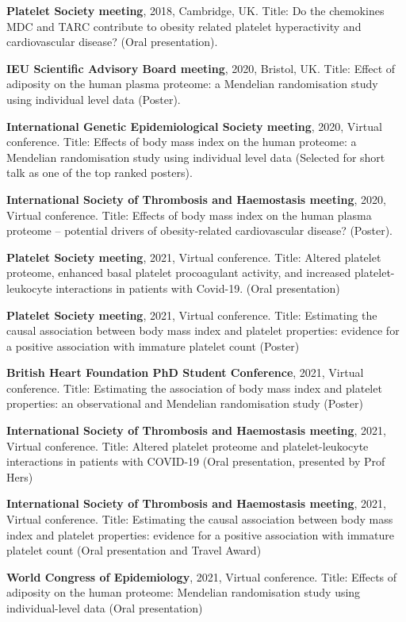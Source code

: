\documentclass[11pt,twoside]{bristolthesis}
\begin{document}
\textbf{Platelet Society meeting}, 2018, Cambridge, UK. Title: Do the chemokines MDC and TARC contribute to obesity related platelet hyperactivity and cardiovascular disease? (Oral presentation).

\textbf{IEU Scientific Advisory Board meeting}, 2020, Bristol, UK. Title: Effect of adiposity on the human plasma proteome: a Mendelian randomisation study using individual level data (Poster).

\textbf{International Genetic Epidemiological Society meeting}, 2020, Virtual conference. Title: Effects of body mass index on the human proteome: a Mendelian randomisation study using individual level data (Selected for short talk as one of the top ranked posters).

\textbf{International Society of Thrombosis and Haemostasis meeting}, 2020, Virtual conference. Title: Effects of body mass index on the human plasma proteome -- potential drivers of obesity-related cardiovascular disease? (Poster).

\textbf{Platelet Society meeting}, 2021, Virtual conference. Title: Altered platelet proteome, enhanced basal platelet procoagulant activity, and increased platelet-leukocyte interactions in patients with Covid-19. (Oral presentation)

\textbf{Platelet Society meeting}, 2021, Virtual conference. Title: Estimating the causal association between body mass index and platelet properties: evidence for a positive association with immature platelet count (Poster)

\textbf{British Heart Foundation PhD Student Conference}, 2021, Virtual conference. Title: Estimating the association of body mass index and platelet properties: an observational and Mendelian randomisation study (Poster)

\textbf{International Society of Thrombosis and Haemostasis meeting}, 2021, Virtual conference. Title: Altered platelet proteome and platelet-leukocyte interactions in patients with COVID-19 (Oral presentation, presented by Prof Hers)

\textbf{International Society of Thrombosis and Haemostasis meeting}, 2021, Virtual conference. Title: Estimating the causal association between body mass index and platelet properties: evidence for a positive association with immature platelet count (Oral presentation and Travel Award)

\textbf{World Congress of Epidemiology}, 2021, Virtual conference. Title: Effects of adiposity on the human proteome: Mendelian randomisation study using individual-level data (Oral presentation)
\end{document}
